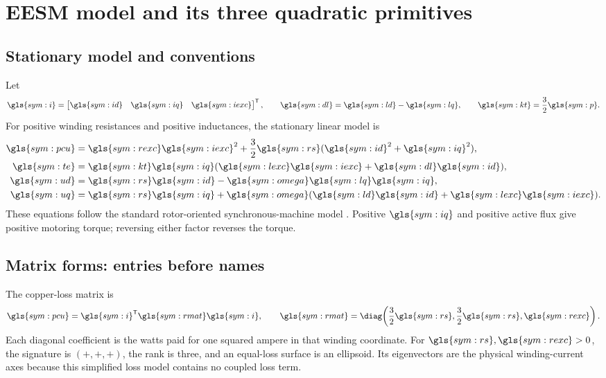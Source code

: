 \section{EESM model and its three quadratic primitives}
\label{sec:model}

\subsection{Stationary model and conventions}

Let
\begin{equation}
 \gls{sym:i}=\begin{bmatrix}\gls{sym:id}&\gls{sym:iq}&\gls{sym:iexc}\end{bmatrix}^{\mathsf T},
 \qquad \gls{sym:dl}=\gls{sym:ld}-\gls{sym:lq},
 \qquad \gls{sym:kt}=\frac32\gls{sym:p}.
\end{equation}
For positive winding resistances and positive inductances, the stationary
linear model is
\begin{align}
 \gls{sym:pcu}&=\gls{sym:rexc}\gls{sym:iexc}^{2}
 +\frac32\gls{sym:rs}(\gls{sym:id}^{2}+\gls{sym:iq}^{2}),
 \label{eq:model-loss}\\
 \gls{sym:te}&=\gls{sym:kt}\gls{sym:iq}
 (\gls{sym:lexc}\gls{sym:iexc}+\gls{sym:dl}\gls{sym:id}),
 \label{eq:model-torque}\\
 \gls{sym:ud}&=\gls{sym:rs}\gls{sym:id}
 -\gls{sym:omega}\gls{sym:lq}\gls{sym:iq},
 \label{eq:model-ud}\\
 \gls{sym:uq}&=\gls{sym:rs}\gls{sym:iq}
 +\gls{sym:omega}(\gls{sym:ld}\gls{sym:id}
 +\gls{sym:lexc}\gls{sym:iexc}).
 \label{eq:model-uq}
\end{align}
These equations follow the standard rotor-oriented synchronous-machine model
\cite{binder2017,schroeder2021}. Positive \(\gls{sym:iq}\) and positive
active flux give positive motoring torque; reversing either factor reverses
the torque.

\subsection{Matrix forms: entries before names}

The copper-loss matrix is
\begin{equation}
 \gls{sym:pcu}=\gls{sym:i}^{\mathsf T}\gls{sym:rmat}\gls{sym:i},\qquad
 \gls{sym:rmat}=\diag\!\left(\frac32\gls{sym:rs},
 \frac32\gls{sym:rs},\gls{sym:rexc}\right).
 \label{eq:R-matrix}
\end{equation}
Each diagonal coefficient is the watts paid for one squared ampere in that
winding coordinate. For \(\gls{sym:rs},\gls{sym:rexc}>0\), the signature is
\((+,+,+)\), the rank is three, and an equal-loss surface is an ellipsoid.
Its eigenvectors are the physical winding-current axes because this simplified
loss model contains no coupled loss term.

